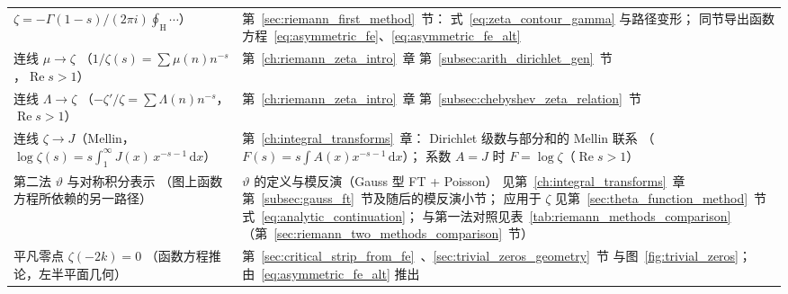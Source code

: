 \begin{table}[htbp]
\begin{tabular}{@{}p{4.9cm}p{8.3cm}@{}}
  $\zeta=-\Gamma(1-s)/(2\pi i)\oint_{\mathrm{H}}\cdots$） &
  第~\ref{sec:riemann_first_method}~节：
  式~\eqref{eq:zeta_contour_gamma} 与路径变形；
  同节导出函数方程~\eqref{eq:asymmetric_fe}、\eqref{eq:asymmetric_fe_alt} \\
连线 $\mu\to\zeta$
  （$1/\zeta(s)=\sum\mu(n)n^{-s}$，$\operatorname{Re}s>1$） &
  第~\ref{ch:riemann_zeta_intro}~章
  第~\ref{subsec:arith_dirichlet_gen}~节 \\
连线 $\Lambda\to\zeta$
  （$-\zeta'/\zeta=\sum\Lambda(n)n^{-s}$，$\operatorname{Re}s>1$） &
  第~\ref{ch:riemann_zeta_intro}~章
  第~\ref{subsec:chebyshev_zeta_relation}~节 \\
连线 $\zeta\to J$（Mellin，
  $\log\zeta(s)=s\int_1^\infty J(x)\,x^{-s-1}\,\mathrm{d}x$） &
  第~\ref{ch:integral_transforms}~章：
  Dirichlet 级数与部分和的 Mellin 联系
  （$F(s)=s\int A(x)x^{-s-1}\,\mathrm{d}x$）；
  系数 $A=J$ 时 $F=\log\zeta$（$\operatorname{Re}s>1$） \\
第二法 $\vartheta$ 与对称积分表示
  （图上函数方程所依赖的另一路径） &
  $\vartheta$ 的定义与模反演（Gauss 型 FT + Poisson）
  见第~\ref{ch:integral_transforms}~章第~\ref{subsec:gauss_ft}~节及随后的模反演小节；
  应用于 $\zeta$ 见第~\ref{sec:theta_function_method}~节式~\eqref{eq:analytic_continuation}；
  与第一法对照见表~\ref{tab:riemann_methods_comparison}
  （第~\ref{sec:riemann_two_methods_comparison}~节） \\
平凡零点 $\zeta(-2k)=0$
  （函数方程推论，左半平面几何） &
  第~\ref{sec:critical_strip_from_fe}~、\ref{sec:trivial_zeros_geometry}~节
  与图~\ref{fig:trivial_zeros}；由~\eqref{eq:asymmetric_fe_alt} 推出 \\
\bottomrule
\end{tabular}
\end{table}
